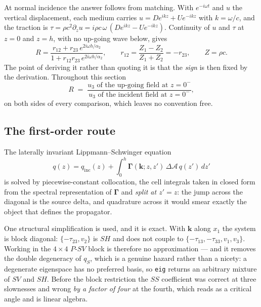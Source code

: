 \documentclass[11pt,a4paper]{article}
\newcommand{\dA}{\Delta\mathcal{A}}
\begin{document}
At normal incidence the answer follows from matching.  With $e^{-i\omega t}$ and
$u$ the vertical displacement, each medium carries
$u = D e^{ikz} + U e^{-ikz}$ with $k = \omega/c$, and the traction is
$\tau = \rho c^2 \partial_z u = i\rho c\,\omega\,(D e^{ikz} - U e^{-ikz})$.
Continuity of $u$ and $\tau$ at $z=0$ and $z=h$, with no up-going wave below,
gives
\begin{equation}\label{eq:normallayer}
  R = \frac{r_{12} + r_{23}\,e^{2i\omega h/\alpha_2}}
           {1 + r_{12}r_{23}\,e^{2i\omega h/\alpha_2}},
  \qquad
  r_{12} = \frac{Z_1-Z_2}{Z_1+Z_2} = -r_{23},
  \qquad Z = \rho c .
\end{equation}
The point of deriving it rather than quoting it is that the \emph{sign} is then
fixed by the derivation.  Throughout this section
\begin{equation}\label{eq:rdef}
  R \;=\;
  \frac{u_3 \text{ of the up-going field at } z=0^-}
       {u_3 \text{ of the incident field at } z=0^-},
\end{equation}
on both sides of every comparison, which leaves no convention free.

\subsection{The first-order route}

The laterally invariant Lippmann--Schwinger equation
\begin{equation}
  q(z) = q_{\text{inc}}(z) +
         \int_0^h \boldsymbol\Gamma(\mathbf{k}; z,z')\,\dA\, q(z')\,dz'
\end{equation}
is solved by piecewise-constant collocation, the cell integrals taken in closed
form from the spectral representation of $\boldsymbol\Gamma$ and \emph{split at
$z'=z$}: the jump across the diagonal is the source delta, and quadrature across
it would smear exactly the object that defines the propagator.

One structural simplification is used, and it is exact.  With $\mathbf{k}$ along
$x_1$ the system is block diagonal: $\{-\tau_{23}, v_2\}$ is $SH$ and does not
couple to $\{-\tau_{13}, -\tau_{33}, v_1, v_3\}$.  Working in the $4\times4$
$P$-$SV$ block is therefore no approximation --- and it removes the double
degeneracy of $q_S$, which is a genuine hazard rather than a nicety: a
degenerate eigenspace has no preferred basis, so \texttt{eig} returns an
arbitrary mixture of $SV$ and $SH$.  Before the block restriction the $SS$
coefficient was correct at three slownesses and wrong \emph{by a factor of four}
at the fourth, which reads as a critical angle and is linear algebra.
\end{document}
